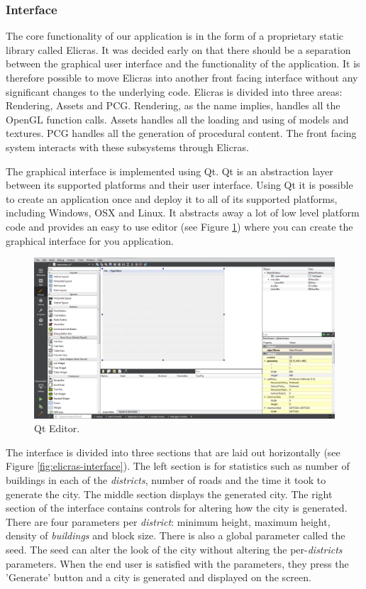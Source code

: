		\subsubsection{Interface}
		The core functionality of our application is in the form of a proprietary static library called Elicras. It was decided early on that there should be a separation between the graphical user interface and the functionality of the application. It is therefore possible to move Elicras into another front facing interface without any significant changes to the underlying code. Elicras is divided into three areas: Rendering, Assets and PCG. Rendering, as the name implies, handles all the OpenGL function calls. Assets handles all the loading and using of models and textures. PCG handles all the generation of procedural content. The front facing system interacts with these subsystems through Elicras.
		
		\par
		The graphical interface is implemented using Qt\cite{QtWebpage}. Qt is an abstraction layer between its supported platforms and their user interface. Using Qt it is possible to create an application once and deploy it to all of its supported platforms, including Windows, OSX and Linux. It abstracts away a lot of low level platform code and provides an easy to use editor (see Figure \ref{fig:qt-editor}) where you can create the graphical interface for you application\cite{Win32Programming}\cite{QtProgramming}.
		
		\begin{figure}[h]
			\centering
			\includegraphics[width=0.7\linewidth]{"Images/Qt"}
			\caption{Qt Editor.}
			\label{fig:qt-editor}
		\end{figure}
		
		\par
		The interface is divided into three sections that are laid out horizontally (see Figure \ref{fig:elicras-interface}). The left section is for statistics such as number of buildings in each of the \textit{districts}, number of roads and the time it took to generate the city. The middle section displays the generated city. The right section of the interface contains controls for altering how the city is generated. There are four parameters per \textit{district}: minimum height, maximum height, density of \textit{buildings} and block size. There is also a global parameter called the seed. The seed can alter the look of the city without altering the per-\textit{districts} parameters. When the end user is satisfied with the parameters, they press the 'Generate' button and a city is generated and displayed on the screen.
		
